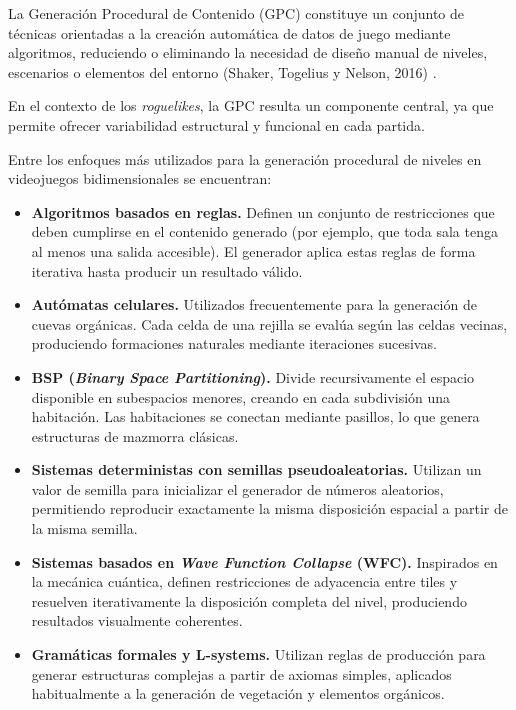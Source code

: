 La Generación Procedural de Contenido (GPC) constituye un conjunto de técnicas orientadas a la creación automática de datos de juego mediante algoritmos, reduciendo o eliminando la necesidad de diseño manual de niveles, escenarios o elementos del entorno (Shaker, Togelius y Nelson, 2016) \cite{SHAKER_PCG}.

En el contexto de los \textit{roguelikes}, la GPC resulta un componente central, ya que permite ofrecer variabilidad estructural y funcional en cada partida.

Entre los enfoques más utilizados para la generación procedural de niveles en videojuegos bidimensionales se encuentran:

\begin{itemize}
\item \textbf{Algoritmos basados en reglas.} Definen un conjunto de restricciones que deben cumplirse en el contenido generado (por ejemplo, que toda sala tenga al menos una salida accesible). El generador aplica estas reglas de forma iterativa hasta producir un resultado válido.
\item \textbf{Autómatas celulares.} Utilizados frecuentemente para la generación de cuevas orgánicas. Cada celda de una rejilla se evalúa según las celdas vecinas, produciendo formaciones naturales mediante iteraciones sucesivas.
\item \textbf{BSP (\textit{Binary Space Partitioning}).} Divide recursivamente el espacio disponible en subespacios menores, creando en cada subdivisión una habitación. Las habitaciones se conectan mediante pasillos, lo que genera estructuras de mazmorra clásicas.
\item \textbf{Sistemas deterministas con semillas pseudoaleatorias.} Utilizan un valor de semilla para inicializar el generador de números aleatorios, permitiendo reproducir exactamente la misma disposición espacial a partir de la misma semilla.
\item \textbf{Sistemas basados en \textit{Wave Function Collapse} (WFC).} Inspirados en la mecánica cuántica, definen restricciones de adyacencia entre tiles y resuelven iterativamente la disposición completa del nivel, produciendo resultados visualmente coherentes.
\item \textbf{Gramáticas formales y L-systems.} Utilizan reglas de producción para generar estructuras complejas a partir de axiomas simples, aplicados habitualmente a la generación de vegetación y elementos orgánicos.
\end{itemize}

